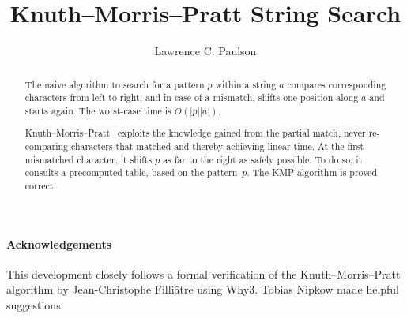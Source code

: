 \documentclass[11pt,a4paper]{article}
\newcommand{\lenarray}[1]{|#1|}
\begin{document}
\title{Knuth--Morris--Pratt String Search}
\author{Lawrence C. Paulson}
\maketitle

\begin{abstract}
The naive algorithm to search for a pattern $p$ within a string $a$ compares
corresponding characters from left to right, and in case of a mismatch,
shifts one position along $a$ and starts again. 
The worst-case time is $O(\lenarray{p}\lenarray{a})$. 

Knuth--Morris--Pratt~\cite{knuth-fast-pattern} 
exploits the knowledge gained from the partial match, 
never re-comparing characters that matched and thereby achieving linear time. 
At the first mismatched character,
it shifts $p$ as far to the right as safely possible. To do so, it consults a
precomputed table, based on the pattern~$p$. The KMP algorithm is proved correct. 
\end{abstract}

\newpage
\tableofcontents

\paragraph*{Acknowledgements}
This development closely follows a formal verification of 
the Knuth--Morris--Pratt algorithm by Jean-Christophe Filliâtre using Why3.
Tobias Nipkow made helpful suggestions.

\newpage





\end{document}
